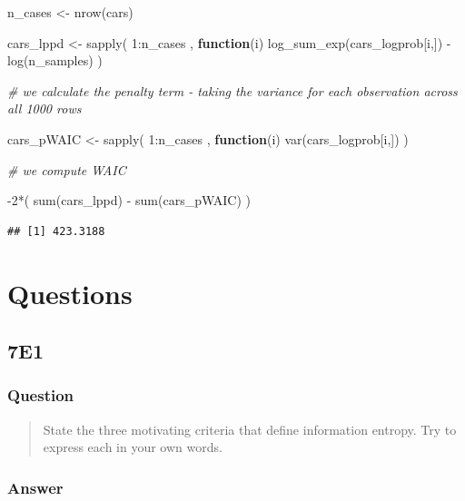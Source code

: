 \documentclass[
]{book}
\newenvironment{Shaded}{\begin{snugshade}}{\end{snugshade}}
\newcommand{\CommentTok}[1]{\textcolor[rgb]{0.56,0.35,0.01}{\textit{#1}}}
\newcommand{\ControlFlowTok}[1]{\textcolor[rgb]{0.13,0.29,0.53}{\textbf{#1}}}
\newcommand{\DecValTok}[1]{\textcolor[rgb]{0.00,0.00,0.81}{#1}}
\newcommand{\FunctionTok}[1]{\textcolor[rgb]{0.00,0.00,0.00}{#1}}
\newcommand{\NormalTok}[1]{#1}
\newcommand{\OtherTok}[1]{\textcolor[rgb]{0.56,0.35,0.01}{#1}}
\newcommand{\SpecialCharTok}[1]{\textcolor[rgb]{0.00,0.00,0.00}{#1}}
\begin{document}
\begin{Shaded}
\begin{Highlighting}[]
\NormalTok{n\_cases }\OtherTok{\textless{}{-}} \FunctionTok{nrow}\NormalTok{(cars) }

\NormalTok{cars\_lppd }\OtherTok{\textless{}{-}} \FunctionTok{sapply}\NormalTok{( }\DecValTok{1}\SpecialCharTok{:}\NormalTok{n\_cases , }\ControlFlowTok{function}\NormalTok{(i) }\FunctionTok{log\_sum\_exp}\NormalTok{(cars\_logprob[i,]) }\SpecialCharTok{{-}} \FunctionTok{log}\NormalTok{(n\_samples) )}

\CommentTok{\# we calculate the penalty term {-} taking the variance for each observation across all 1000 rows}

\NormalTok{cars\_pWAIC }\OtherTok{\textless{}{-}} \FunctionTok{sapply}\NormalTok{( }\DecValTok{1}\SpecialCharTok{:}\NormalTok{n\_cases , }\ControlFlowTok{function}\NormalTok{(i) }\FunctionTok{var}\NormalTok{(cars\_logprob[i,]) )}

\CommentTok{\# we compute WAIC}

\SpecialCharTok{{-}}\DecValTok{2}\SpecialCharTok{*}\NormalTok{( }\FunctionTok{sum}\NormalTok{(cars\_lppd) }\SpecialCharTok{{-}} \FunctionTok{sum}\NormalTok{(cars\_pWAIC) )}
\end{Highlighting}
\end{Shaded}

\begin{verbatim}
## [1] 423.3188
\end{verbatim}

\hypertarget{questions-6}{%
\section{Questions}\label{questions-6}}

\hypertarget{e1-5}{%
\subsection*{7E1}\label{e1-5}}

\hypertarget{question-60}{%
\subsubsection*{Question}\label{question-60}}

\begin{quote}
State the three motivating criteria that define information entropy. Try to express each in your own words.
\end{quote}

\hypertarget{answer-60}{%
\subsubsection*{Answer}\label{answer-60}}
\end{document}
